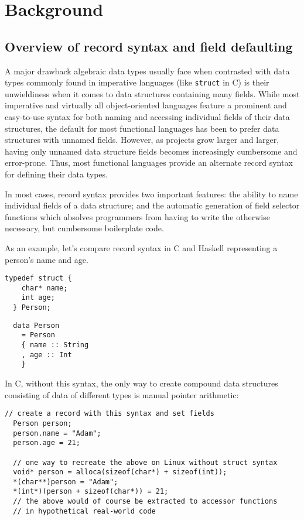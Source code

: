 \documentclass[en]{pracamgr}
\begin{document}
\chapter{Background}\label{r:bg}
\section{Overview of record syntax and field defaulting}
A major drawback algebraic data types usually face when contrasted with data types commonly found in imperative languages (like \texttt{struct} in C) is their unwieldiness when it comes to data structures containing many fields.
While most imperative and virtually all object-oriented languages feature a prominent and easy-to-use syntax for both naming and accessing individual fields of their data structures, the default for most functional languages has been to prefer data structures with unnamed fields.
However, as projects grow larger and larger, having only unnamed data structure fields becomes increasingly cumbersome and error-prone.
Thus, most functional languages provide an alternate record syntax for defining their data types. 

In most cases, record syntax provides two important features: 
the ability to name individual fields of a data structure; 
and the automatic generation of field selector functions which
absolves programmers from having to write the otherwise necessary,
but cumbersome boilerplate code.

As an example, let's compare record syntax in C and Haskell representing a person's name and age.

\begin{lstlisting}[style=c]
  typedef struct {
    char* name;
    int age;
  } Person;
\end{lstlisting}

\begin{lstlisting}
  data Person 
    = Person 
    { name :: String
    , age :: Int
    }
\end{lstlisting}
In C, without this syntax, the only way to create compound data structures consisting of data of different types is manual pointer arithmetic:\\
\begin{minipage}{\linewidth}
\begin{lstlisting}[style=c]
  // create a record with this syntax and set fields
  Person person;
  person.name = "Adam";
  person.age = 21;

  // one way to recreate the above on Linux without struct syntax
  void* person = alloca(sizeof(char*) + sizeof(int));
  *(char**)person = "Adam";
  *(int*)(person + sizeof(char*)) = 21;
  // the above would of course be extracted to accessor functions
  // in hypothetical real-world code
\end{lstlisting}
\end{minipage}
\end{document}
